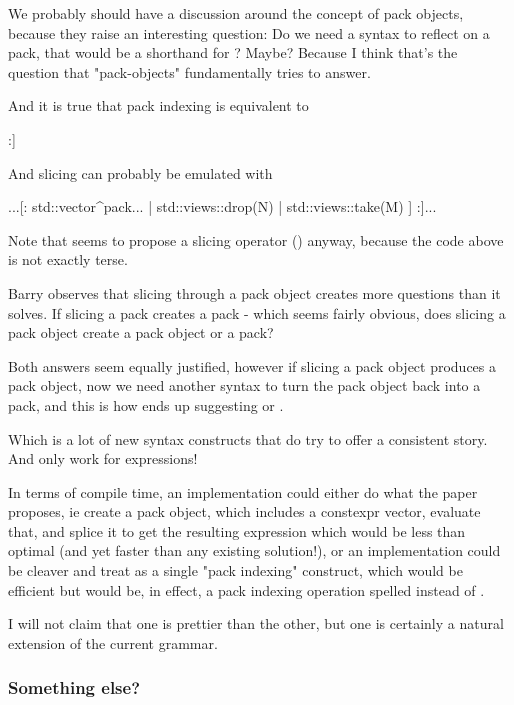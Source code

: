 \documentclass{wg21}
\begin{document}
We probably should have a discussion around the concept of pack objects, because they raise an interesting question:
Do we need a syntax to reflect on a pack, that would be a shorthand for ? Maybe?
Because I think that's the question that "pack-objects" fundamentally tries to answer.

And it is true that pack indexing is equivalent to
\begin{colorblock}
 [: std::vector{^pack...}[N] :]
\end{colorblock}

And slicing can probably be emulated with

\begin{colorblock}
...[: std::vector{^pack...} | std::views::drop(N) | std::views::take(M) ] :]...
\end{colorblock}

Note that  seems to propose a slicing operator () anyway,
because the code above is not exactly terse.

Barry observes that slicing through a pack object creates more questions than it solves.
If slicing a pack creates a pack - which seems fairly obvious, does slicing a pack object create a pack object or a pack?

Both answers seem equally justified, however if slicing a pack object produces a pack object, now we need another syntax
to turn the pack object back into a pack, and this is how 
ends up suggesting  or .

Which is a lot of new syntax constructs that do try to offer a consistent story.
And only work for expressions!

In terms of compile time, an implementation could either do what the paper proposes,
ie create a pack object, which includes a constexpr vector, evaluate that, and splice it to get the resulting expression
which would be less than optimal (and yet faster than any existing solution!), or an implementation
could be cleaver and treat \tcode{![N]} as a single "pack indexing" construct, which would be efficient but would be, in effect,
a pack indexing operation spelled \tcode{![]} instead of .

I will not claim that one is prettier than the other, but one is certainly a natural extension of the current grammar.\subsubsection{Something else?}
\end{document}
